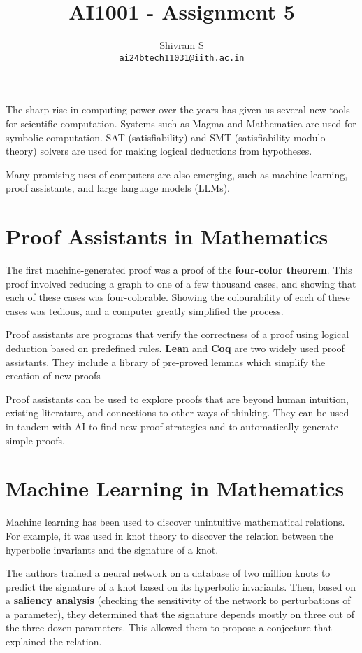 \documentclass{article}
\author{Shivram S \\ \texttt{ai24btech11031@iith.ac.in}}
\title{AI1001 - Assignment 5}
\begin{document}
\maketitle

The sharp rise in computing power over the years has given
us several new tools for scientific computation. Systems such
as Magma and Mathematica are used for symbolic computation.
SAT (satisfiability) and SMT (satisfiability modulo theory)
solvers are used for making logical deductions from hypotheses.

Many promising uses of computers are also emerging, such as
machine learning, proof assistants, and large language models (LLMs).

\section{Proof Assistants in Mathematics}

The first machine-generated proof was a proof of the
\textbf{four-color theorem}. This proof involved reducing
a graph to one of a few thousand cases, and showing that
each of these cases was four-colorable. Showing the
colourability of each of these cases was tedious, and
a computer greatly simplified the process.

Proof assistants are programs that verify the correctness
of a proof using logical deduction based on predefined rules.
\textbf{Lean} and \textbf{Coq} are two widely used proof assistants.
They include a library of pre-proved lemmas which simplify
the creation of new proofs

Proof assistants can be used to explore proofs that are beyond
human intuition, existing literature, and connections to
other ways of thinking. They can be used in tandem with AI to 
find new proof strategies and to automatically generate simple proofs.


\section{Machine Learning in Mathematics}

Machine learning has been used to discover unintuitive mathematical
relations. For example, it was used in knot theory to discover the
relation between the hyperbolic invariants and the signature of a knot.

The authors trained a neural network on a database of two million knots
to predict the signature of a knot based on its hyperbolic invariants.
Then, based on a \textbf{saliency analysis}
(checking the sensitivity of the network to perturbations of a parameter),
they determined that the signature depends mostly on three out of the
three dozen parameters. This allowed them to propose a conjecture that
explained the relation.
\end{document}

